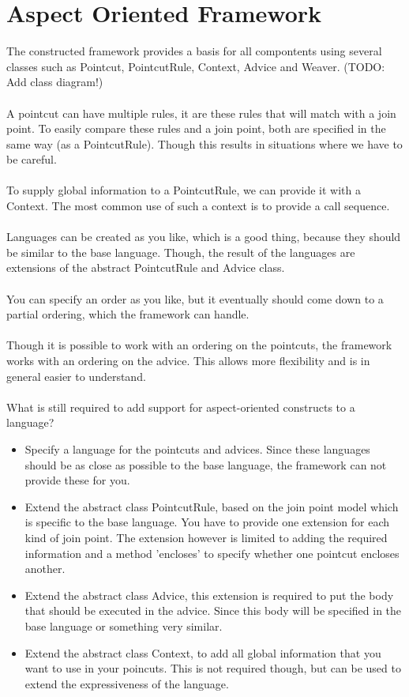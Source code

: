 \documentclass[a4paper]{report}
\begin{document}
\chapter{Aspect Oriented Framework}
The constructed framework provides a basis for all compontents using several classes such as Pointcut, PointcutRule, Context, Advice and Weaver. (TODO: Add class diagram!)\\
\\
A pointcut can have multiple rules, it are these rules that will match with a join point. To easily compare these rules and a join point, both are specified in the same way (as a PointcutRule). Though this results in situations where we have to be careful.\\
\\
To supply global information to a PointcutRule, we can provide it with a Context. The most common use of such a context is to provide a call sequence.\\
\\
Languages can be created as you like, which is a good thing, because they should be similar to the base language. Though, the result of the languages are extensions of the abstract PointcutRule and Advice class.\\
\\
You can specify an order as you like, but it eventually should come down to a partial ordering, which the framework can handle.\\
\\
Though it is possible to work with an ordering on the pointcuts, the framework works with an ordering on the advice. This allows more flexibility and is in general easier to understand.\\
\\
What is still required to add support for aspect-oriented constructs to a language?
\begin{itemize}
\item Specify a language for the pointcuts and advices. Since these languages should be as close as possible to the base language, the framework can not provide these for you.
\item Extend the abstract class PointcutRule, based on the join point model which is specific to the base language. You have to provide one extension for each kind of join point. The extension however is limited to adding the required information and a method 'encloses' to specify whether one pointcut encloses another.
\item Extend the abstract class Advice, this extension is required to put the body that should be executed in the advice. Since this body will be specified in the base language or something very similar.
\item Extend the abstract class Context, to add all global information that you want to use in your poincuts. This is not required though, but can be used to extend the expressiveness of the language.
\end{itemize} 
\end{document}
